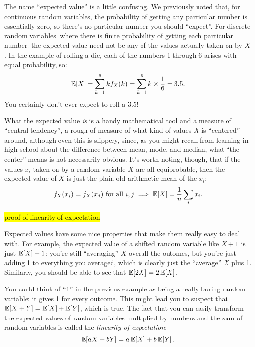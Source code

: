 The name ``expected value'' is a little confusing. We previously noted that,
for continuous random variables, the probability of getting any particular
number is essentially zero, so there's no particular number you should
``expect''. For discrete random variables, where there is finite probability
of getting each particular number, the expected value need not be any of the
values actually taken on by $X$. In the example of rolling a die, each of the
numbers 1 through 6 arises with equal probability, so:
\begin{equation}
\mathbb{E}\!\left[{X}\right] = \sum_{k=1}^6 k f_X(k) = \sum_{k=1}^6 k \times \frac{1}{6} = 3.5.
\end{equation}
You certainly don't ever expect to roll a 3.5!

What the expected value \emph{is} is a handy mathematical tool and a measure
of ``central tendency'', a rough of measure of what kind of values $X$ is
``centered'' around, although even this is slippery, since, as you might
recall from learning in high school about the difference between mean, mode, and median, what ``the
center'' means is not necessarily obvious. It's worth noting, though, that if
the values $x_i$ taken on by a random variable $X$ are all equiprobable, then
the expected value of $X$ is just the plain-old arithmetic mean of the $x_i$:
\begin{equation}
f_X(x_i) = f_X(x_j) \text{ for all } i, j \implies \mathbb{E}\!\left[{X}\right] = \frac{1}{n} \sum_i x_i.
\end{equation}

\hl{proof of linearity of expectation}

Expected values have some nice properties that make them really easy to deal
with. For example, the expected value of a shifted random variable like $X +
1$ is just $\mathbb{E}\!\left[{X}\right] + 1$: you're still ``averaging'' $X$ overall the
outomes, but you're just adding 1 to everything you averaged, which is clearly
just the ``average'' $X$ plus 1. Similarly, you should be able to see that
$\mathbb{E}\!\left[{2X}\right] = 2 \,\mathbb{E}\!\left[{X}\right]$.

You could think of ``1'' in the previous example as being a really boring
random variable: it gives 1 for every outcome. This might lead you to suspect
that $\mathbb{E}\!\left[{X + Y}\right] = \mathbb{E}\!\left[{X}\right] + \mathbb{E}\!\left[{Y}\right]$, which is true. The fact that
you can easily transform the expected values of random variables multiplied by
numbers and the sum of random variables is called the \emph{linearity of expectation}:
\begin{equation}
\mathbb{E}\!\left[{aX + bY}\right] = a \,\mathbb{E}\!\left[{X}\right] + b \,\mathbb{E}\!\left[{Y}\right].
\end{equation}

